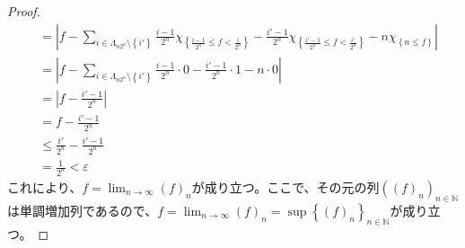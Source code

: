 \documentclass[dvipdfmx]{jsarticle}
\begin{document}
\begin{proof}
\begin{align*}
&= \left| f - \sum_{i \in \varLambda_{n2^{n}} \setminus \left\{ i' \right\}} {\frac{i - 1}{2^{n}}\chi_{\left\{ \frac{i - 1}{2^{n}} \leq f < \frac{i}{2^{n}} \right\}}} - \frac{i' - 1}{2^{n}}\chi_{\left\{ \frac{i' - 1}{2^{n}} \leq f < \frac{i'}{2^{n}} \right\}} - n\chi_{\left\{ n \leq f \right\}} \right|\\
&= \left| f - \sum_{i \in \varLambda_{n2^{n}} \setminus \left\{ i' \right\}} {\frac{i - 1}{2^{n}} \cdot 0} - \frac{i' - 1}{2^{n}} \cdot 1 - n \cdot 0 \right|\\
&= \left| f - \frac{i' - 1}{2^{n}} \right|\\
&= f - \frac{i' - 1}{2^{n}}\\
&\leq \frac{i'}{2^{n}} - \frac{i' - 1}{2^{n}}\\
&= \frac{1}{2^{n}} < \varepsilon
\end{align*}
これにより、$f = \lim_{n \rightarrow \infty}(f)_{n}$が成り立つ。ここで、その元の列$\left( (f)_{n} \right)_{n \in \mathbb{N}}$は単調増加列であるので、$f = \lim_{n \rightarrow \infty}(f)_{n} = \sup\left\{ (f)_{n} \right\}_{n \in \mathbb{N}}$が成り立つ。
\end{proof}
\end{document}
